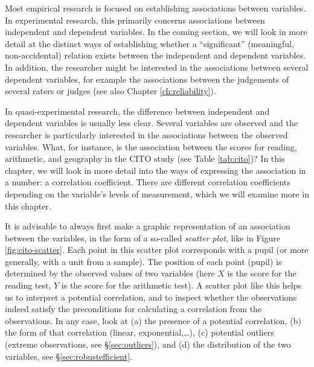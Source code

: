 \documentclass[
]{book}
\begin{document}
Most empirical research is focused on establishing associations between
variables. In experimental research, this primarily concerns associations
between independent and dependent variables. In the coming section, we will
look in more detail at the distinct ways of establishing whether a ``significant''
(meaningful, non-accidental) relation exists between
the independent and dependent variables. In addition, the researcher might be
interested in the associations between several dependent variables,
for example the associations between the judgements of several
raters or judges (see also Chapter \ref{ch:reliability}).

In quasi-experimental research, the difference between
independent and dependent variables is usually less clear. Several
variables are observed and the researcher is particularly interested
in the associations between the observed
variables. What, for instance, is the association between the scores for reading,
arithmetic, and geography in the CITO study (see
Table \ref{tab:cito})? In this chapter, we will look in more detail
into the ways of expressing the association in a number:
a correlation coefficient. There are different correlation coefficients depending on
the variable's levels of measurement, which we will
examine more in this chapter.

It is advisable to always first make a graphic representation of
an association between the variables, in the form of a so-called
\emph{scatter plot},
like in Figure \ref{fig:cito-scatter}. Each point in this scatter plot
corresponds with a pupil (or more generally, with a unit from a
sample). The position of each point (pupil) is determined by the observed
values of two variables (here \(X\) is the score for the reading test,
\(Y\) is the score for the arithmetic test). A scatter plot like this helps us to
interpret a potential correlation, and to inspect whether the observations
indeed satisfy the preconditions for calculating a correlation from the
observations. In any case, look at (a) the presence of a potential correlation,
(b) the form of that correlation (linear, exponential,\ldots),
(c) potential outliers (extreme observations, see §\ref{sec:outliers}),
and (d) the distribution of the two variables,
see §\ref{sec:robustefficient}.
\end{document}
